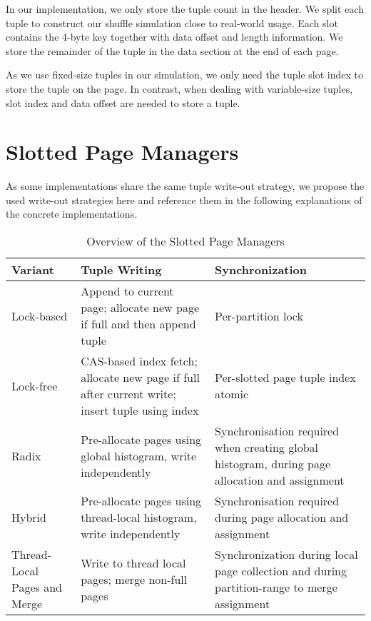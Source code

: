In our implementation, we only store the tuple count in the header.
We split each tuple to construct our shuffle simulation close to real-world usage.
Each slot contains the 4-byte key together with data offset and length information.
We store the remainder of the tuple in the data section at the end of each page.

As we use fixed-size tuples in our simulation, we only need the tuple slot index to store the tuple on the page.
In contrast, when dealing with variable-size tuples, slot index and data offset are needed to store a tuple.

\section{Slotted Page Managers}\label{section-slotted-page-managers}
As some implementations share the same tuple write-out strategy, we propose the used write-out strategies here and reference them in the following explanations of the concrete implementations.

\begin{table}[h]
  \centering
  \small
  \begin{tabular}{|p{}|p{}|p{}|}
    \hline
    \textbf{Variant}             & \textbf{Tuple Writing}                                                                         & \textbf{Synchronization}                                                                       \\
    \hline
    Lock-based                   & Append to current page; allocate new page if full and then append tuple                        & Per-partition lock                                                                             \\\hline
    Lock-free                    & CAS-based index fetch; allocate new page if full after current write; insert tuple using index & Per-slotted page tuple index atomic                                                            \\\hline
    Radix                        & Pre-allocate pages using global histogram, write independently                                 & Synchronisation required when creating global histogram, during page allocation and assignment \\\hline
    Hybrid                       & Pre-allocate pages using thread-local histogram, write independently                           & Synchronisation required during page allocation and assignment                                 \\\hline
    Thread-Local Pages and Merge & Write to thread local pages; merge non-full pages                                              & Synchronization during local page collection and during partition-range to merge assignment    \\\hline
  \end{tabular}
  \caption{Overview of the Slotted Page Managers}
\end{table}

